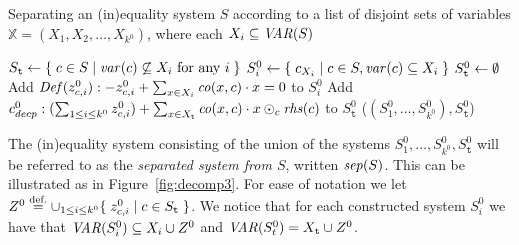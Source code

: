 \begin{algorithm}
\caption{Separating an (in)equality system $S$ according to a list of disjoint sets of variables $\mathbb{X}=(X_1, X_2, \ldots, X_{k^0})$, where each $X_i\subseteq \mathit{VAR}(S)$}\label{alg:separate}
\begin{algorithmic}[1]
\State $S_{\texttt{t}} \gets \{\;{c\in S}\;|\;{\mathit{var}(c)\not\subseteq X_i\text{ for any } i}\;\}$
	\State $S^0_i \gets \{\;{c_{X_i}}\;|\;{c\in S, \mathit{var}(c)\subseteq X_i}\;\}$%
\EndFor
\State $S^0_{\texttt{t}}\gets \emptyset$ %
		\State Add $\mathit{Def}(z^0_{c,i}): -z^{0}_{c,i} + \sum_{x\in X_i} \mathit{co}(x,c)\cdot x = 0$ to $S_i^0$
	\EndFor
	\State Add $c^0_{decp}: (\sum_{1\leq i\leq k^0} z_{c,i}^0) +\sum_{x\in X_\texttt{t}}\mathit{co}(x,c)\cdot x \odot_c \mathit{rhs}(c)$ to $S^0_\texttt{t}$ 
\EndFor
\State\Return ($(S^0_1,\ldots, S^0_{k^0}), S^0_\texttt{t}$)
\EndFunction
\end{algorithmic}
\end{algorithm}

The (in)equality system consisting of the union of the systems $S^0_1,\ldots, S^0_{k^0}, S^0_\texttt{t}$ will be referred to as the \emph{separated system from $S$}, written $\mathit{sep}(S)$. This can be illustrated as in Figure~\ref{fig:decomp3}. For ease of notation we let $Z^0 \overset{\text{def.}}= \cup_{1\leq i\leq k^0}\{\;{z^0_{c,i}}\;|\;{c\in S_{\texttt{t}}}\;\}$. We notice that for each constructed system $S^0_i$ we have that $\mathit{VAR}(S^0_i)\subseteq X_i\cup Z^0$ and $\mathit{VAR}(S^0_t) = X_{\texttt{t}} \cup Z^0$. 

